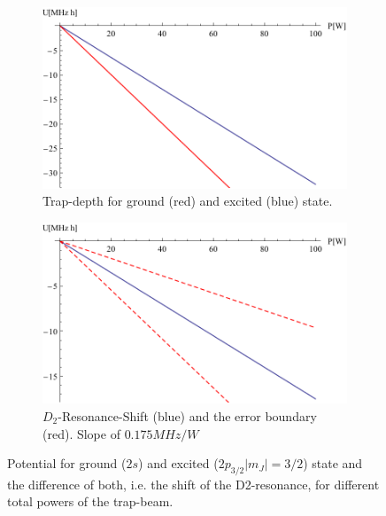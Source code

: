 \begin{figure}[h]
\centering
\begin{subfigure}[b]{0.4\textwidth}
                \includegraphics[width=\textwidth]{shift}
                \caption{Trap-depth for ground (red) and excited (blue) state.}
\end{subfigure}
\begin{subfigure}[b]{0.4\textwidth}
               \includegraphics[width=\textwidth]{difshifterror}
                \caption{$D_2$-Resonance-Shift (blue) and the error boundary (red). Slope of $0.175\unit{MHz/W}$}
\end{subfigure}


\caption{Potential for ground ($2s$) and excited ($2p_{3/2}$$|m_J|=3/2$) state and the difference of both, i.e. the shift of the D2-resonance, for different total powers of the trap-beam.}
\label{potential}
\end{figure}

